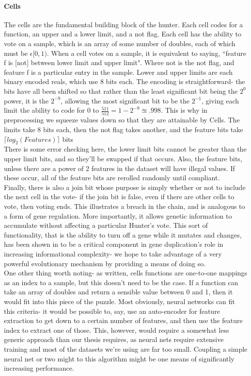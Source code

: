 \paragraph{Cells}
The cells are the fundamental building block of the hunter.  Each cell codes for a function, an upper and a lower limit, and a not flag.  Each cell has the ability to vote on a sample, which is an array of some number of doubles, each of which must be $\epsilon[0,1)$.  When a cell votes on a sample, it is equivalent to saying, ``feature f is [not] between lower limit and upper limit".  Where not is the not flag, and feature f is a particular entry in the sample.  Lower and upper limits are each binary encoded reals, which use 8 bits each.  The encoding is straightforward- the bits have all been shifted so that rather than the least significant bit being the $2^0$ power, it is the $2^{-9}$, allowing the most significant bit to be the $2^{-1}$, giving each limit the ability to code for 0 to $\frac{511}{512}= 1-2^{-9} \approxeq .998 $.  This is why in preprocessing we squeeze values down so that they are attainable by Cells.  The limits take 8 bits each, then the not flag takes another, and the feature bits take $\lceil log_2(Features)\rceil$ bits\\There is some error checking here, the lower limit bits cannot be greater than the upper limit bits, and so they'll be swapped if that occurs.  Also, the feature bits, unless there are a power of 2 features in the dataset will have illegal values.  If these occur, all of the feature bits are rerolled randomly until compliant.\\
Finally, there is also a join bit whose purpose is simply whether or not to include the next cell in the vote- if the join bit is false, even if there are other cells to vote, then voting ends.  This illustrates a breach in the chain, and is  analogous to a form of gene regulation.  More importantly, it allows genetic information to accumulate without affecting a particular Hunter's vote.  This sort of functionality, that is the ability to turn off a gene while it mutates and changes, has been shown in \cite{zhang_evolution_2003} to be a critical component in gene duplication's role in increasing informational complexity- we hope to take advantage of a very powerful evolutionary mechanism by providing a means of doing so.\\
One other thing worth noting- as written, cells functions are one-to-one mappings as an index to a sample, but this doesn't need to be the case.  If a function can take an array of doubles and return a sensible value between 0 and 1, then it would fit into this piece of the puzzle.  Most obviously, neural networks can fit this criteria- it would be possible to, say, use an auto-encoder for feature extraction to get down to a certain number of features, and then use the feature index to extract one of those.  This, however, would require a somewhat less generic approach than our thesis requires, as neural nets require extensive training and most of the datasets we're using are far too small.  Coupling a simple neural net or two might to this algorithm might be one means of significantly increasing performance. \\
